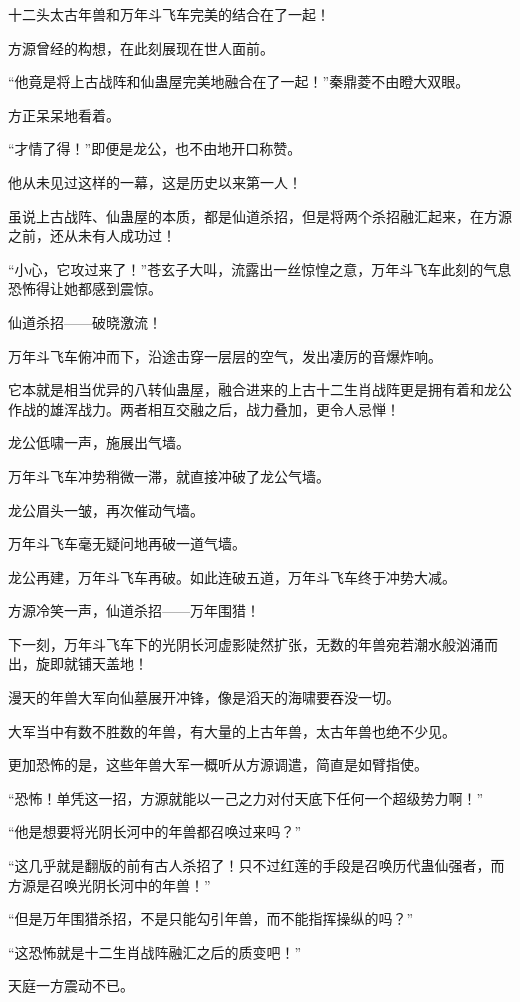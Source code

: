 \begin{this_body}
十二头太古年兽和万年斗飞车完美的结合在了一起！

方源曾经的构想，在此刻展现在世人面前。

“他竟是将上古战阵和仙蛊屋完美地融合在了一起！”秦鼎菱不由瞪大双眼。

方正呆呆地看着。

“才情了得！”即便是龙公，也不由地开口称赞。

他从未见过这样的一幕，这是历史以来第一人！

虽说上古战阵、仙蛊屋的本质，都是仙道杀招，但是将两个杀招融汇起来，在方源之前，还从未有人成功过！

“小心，它攻过来了！”苍玄子大叫，流露出一丝惊惶之意，万年斗飞车此刻的气息恐怖得让她都感到震惊。

仙道杀招——破晓激流！

万年斗飞车俯冲而下，沿途击穿一层层的空气，发出凄厉的音爆炸响。

它本就是相当优异的八转仙蛊屋，融合进来的上古十二生肖战阵更是拥有着和龙公作战的雄浑战力。两者相互交融之后，战力叠加，更令人忌惮！

龙公低啸一声，施展出气墙。

万年斗飞车冲势稍微一滞，就直接冲破了龙公气墙。

龙公眉头一皱，再次催动气墙。

万年斗飞车毫无疑问地再破一道气墙。

龙公再建，万年斗飞车再破。如此连破五道，万年斗飞车终于冲势大减。

方源冷笑一声，仙道杀招——万年围猎！

下一刻，万年斗飞车下的光阴长河虚影陡然扩张，无数的年兽宛若潮水般汹涌而出，旋即就铺天盖地！

漫天的年兽大军向仙墓展开冲锋，像是滔天的海啸要吞没一切。

大军当中有数不胜数的年兽，有大量的上古年兽，太古年兽也绝不少见。

更加恐怖的是，这些年兽大军一概听从方源调遣，简直是如臂指使。

“恐怖！单凭这一招，方源就能以一己之力对付天底下任何一个超级势力啊！”

“他是想要将光阴长河中的年兽都召唤过来吗？”

“这几乎就是翻版的前有古人杀招了！只不过红莲的手段是召唤历代蛊仙强者，而方源是召唤光阴长河中的年兽！”

“但是万年围猎杀招，不是只能勾引年兽，而不能指挥操纵的吗？”

“这恐怖就是十二生肖战阵融汇之后的质变吧！”

天庭一方震动不已。


\end{this_body}
